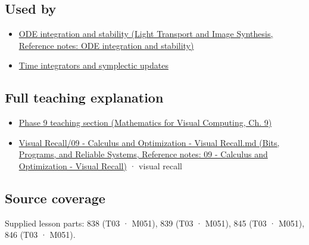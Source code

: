 \subsection{Used by}\label{appendix-e8ab9836882e-used-by}

\begin{itemize}
\tightlist
\item
  \href{../04-Light-Transport-and-Image-Synthesis/main.pdf\#nameddest=appendix-18eacf61a04b}{ODE integration and stability (Light Transport and Image Synthesis, Reference notes: ODE integration and stability)}
\item
  \hyperref[appendix-8f96f9c4d5bc]{Time integrators and symplectic updates}
\end{itemize}

\subsection{Full teaching explanation}\label{appendix-e8ab9836882e-full-teaching-explanation}

\begin{itemize}
\tightlist
\item
  \href{../02-Mathematics-for-Visual-Computing/main.pdf\#nameddest=02-foundations-ii-ch025-odes-and-numerical-simulation}{Phase 9 teaching section (Mathematics for Visual Computing, Ch. 9)}
\item
  \href{../01-Bits-Programs-and-Reliable-Systems/main.pdf\#nameddest=appendix-adf48f5dc5c1}{Visual Recall/09 - Calculus and Optimization - Visual Recall.md (Bits, Programs, and Reliable Systems, Reference notes: 09 - Calculus and Optimization - Visual Recall)} · visual recall
\end{itemize}

\subsection{Source coverage}\label{appendix-e8ab9836882e-source-coverage}

Supplied lesson parts: 838 (T03 · M051), 839 (T03 · M051), 845 (T03 · M051), 846 (T03 · M051).
